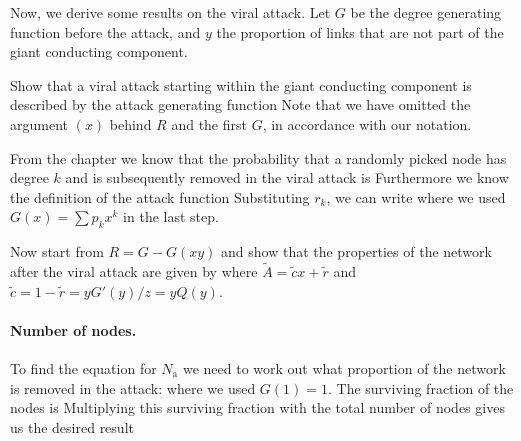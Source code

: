 
Now, we derive some results on the viral attack. Let $G$ be the degree generating function before the attack, and $y$ the proportion of links that are not part of the giant conducting component. 

\subquestion 
Show that a viral attack starting within the giant conducting component is described by the attack generating function 
Note that we have omitted the argument $(x)$ behind $R$ and the first $G$, in accordance with our notation. 

\solution
From the chapter we know that the probability that a randomly picked node has degree $k$ and is subsequently removed in the viral attack is 
Furthermore we know the definition of the attack function
Substituting $r_k$, we can write
where we used $G(x)=\sum p_k x^k$ in the last step.

\subquestion
Now start from $R=G-G(xy)$ and show that the properties of the network after the viral attack are given by 
where $\tilde{A}=\tilde{c}x+\tilde{r}$ and $\tilde{c}=1-\tilde{r}=yG'(y)/z=yQ(y)$. 

\solution
\paragraph{Number of nodes.} To find the equation for $N_\mathrm{a} $ we need to work out what proportion of the network is removed in the attack: 
where we used $G(1)=1$. The surviving fraction of the nodes is
Multiplying this surviving fraction with the total number of nodes gives us the desired result 

